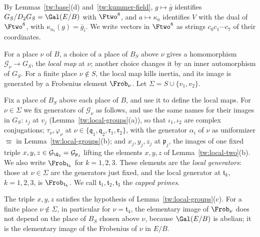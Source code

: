 By Lemmas~\ref{tw:base}(d) and~\ref{tw:kummer-field}, $g\mapsto\bar g$
identifies $G_S/D_2G_S=\Gal(E/B)$ with $\Ftwo^8$, and $a\mapsto\kappa_a$
identifies $V$ with the dual of $\Ftwo^8$, with $\kappa_{\alpha_i}(g)=\bar g_i$.
We write vectors in $\Ftwo^8$ as strings $c_0c_1\cdots c_7$ of their
coordinates.

For a place $\nu$ of $B$, a choice of a place of $B_S$ above $\nu$ gives a
homomorphism $\mathcal G_\nu\to G_S$, the \emph{local map} at $\nu$; another
choice changes it by an inner automorphism of $G_S$. For a finite
place $\nu\notin S$, the local map kills inertia, and its image is generated
by a Frobenius element $\Frob_\nu$. Let $\Sigma=S\cup\{v_1,v_2\}$.

\begin{definition}\label{tw:local-generators}
Fix a place of $B_S$ above each place of $B$, and use it to define the local
maps. For $\nu\in\Sigma$ we fix generators of $\mathcal G_\nu$ as follows,
and use the same names for their images in $G_S$: $\iota_j$ at $v_j$
(Lemma~\ref{tw:local-groups}(a)), so that $\iota_1,\iota_2$ are complex
conjugations; $\tau_\nu,\varphi_\nu$ at
$\nu\in\{\mathfrak q_1,\mathfrak q_2,\mathfrak r_1,\mathfrak r_2\}$, with the
generator $\alpha_i$ of $\nu$ as uniformizer $\varpi$ in
Lemma~\ref{tw:local-groups}(b); and $x_j,y_j,z_j$ at $\mathfrak p_j$, the
images of one fixed triple $x,y,z\in\mathcal G_{\Q_2}=\mathcal G_{\mathfrak p_j}$
lifting the elements $x,y,z$ of Lemma~\ref{tw:local-two}(b). We also write
$\Frob_{\mathfrak t_k}$ for $k=1,2,3$. These elements are the \emph{local
generators}: those at $\nu\in\Sigma$ are the generators just fixed, and the
local generator at $\mathfrak t_k$, $k=1,2,3$, is $\Frob_{\mathfrak t_k}$. We
call $\mathfrak t_1,\mathfrak t_2,\mathfrak t_3$ the \emph{capped primes}.
\end{definition}

The triple $x,y,z$ satisfies the hypothesis of
Lemma~\ref{tw:local-groups}(c). For a finite place $\nu\notin\Sigma$, in
particular for $\nu=\mathfrak t_4$, the elementary image of $\Frob_\nu$ does
not depend on the place of $B_S$ chosen above $\nu$, because $\Gal(E/B)$ is
abelian; it is the elementary image of the Frobenius of $\nu$ in $E/B$.

